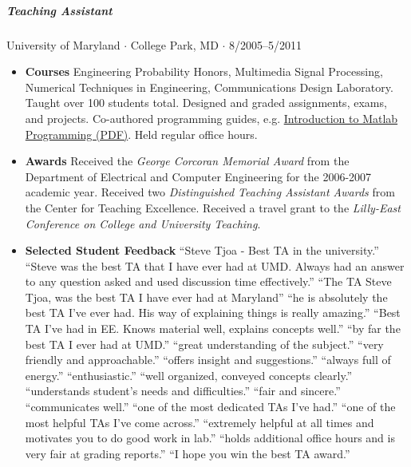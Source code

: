 \documentclass[10pt,letterpaper]{article}
\begin{document}
\subparagraph{Teaching Assistant}
University of Maryland $\cdot$ College Park, MD $\cdot$ 8/2005--5/2011
\begin{itemize}
    \item \textbf{Courses} Engineering Probability Honors, Multimedia Signal Processing, Numerical Techniques in Engineering, Communications Design Laboratory. Taught over 100 students total. Designed and graded assignments, exams, and projects. Co-authored programming guides, e.g. \href{http://up.stevetjoa.com/408_0608_matlab_intro.pdf}{Introduction to Matlab Programming (PDF)}. Held regular office hours. 
    \item \textbf{Awards} Received the \textit{George Corcoran Memorial Award} from the Department of Electrical and Computer Engineering for the 2006-2007 academic year.  Received two \textit{Distinguished Teaching Assistant Awards} from the Center for Teaching Excellence.  Received a travel grant to the \textit{Lilly-East Conference on College and University Teaching}.
    \item \textbf{Selected Student Feedback}  ``Steve Tjoa - Best TA in the university.'' ``Steve was the best TA that I have ever had at UMD. Always had an answer to any question asked and used discussion time effectively.'' ``The TA Steve Tjoa, was the best TA I have ever had at Maryland'' ``he is absolutely the best TA I've ever had. His way of explaining things is really amazing.'' ``Best TA I've had in EE. Knows material well, explains concepts well.'' ``by far the best TA I ever had at UMD.''  ``great understanding of the subject.'' ``very friendly and approachable.'' ``offers insight and suggestions.'' ``always full of energy.''  ``enthusiastic.'' ``well organized, conveyed concepts clearly.'' ``understands student's needs and difficulties.'' ``fair and sincere.'' ``communicates well.'' ``one of the most dedicated TAs I've had.'' ``one of the most helpful TAs I've come across.'' ``extremely helpful at all times and motivates you to do good work in lab.'' ``holds additional office hours and is very fair at grading reports.'' ``I hope you win the best TA award.''
\end{itemize}
\end{document}
